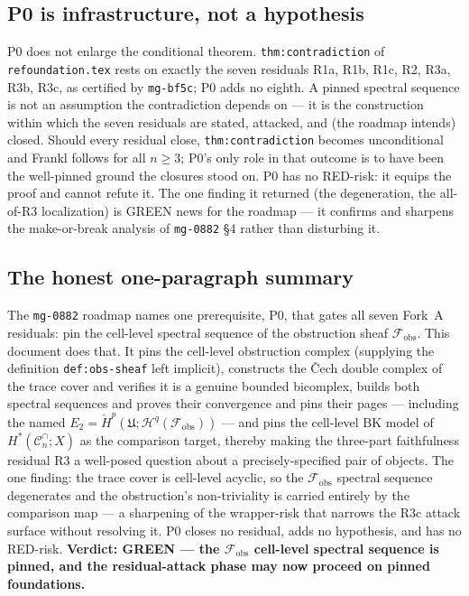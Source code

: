 \documentclass[11pt,oneside]{amsart}
\theoremstyle{plain}
\theoremstyle{definition}
\theoremstyle{remark}
\theoremstyle{honeststyle}
\newcommand{\Cn}{\mathcal{C}^{\cap}_n}
\newcommand{\BK}{\mathrm{BK}}
\newcommand{\fobs}{\mathcal{F}_{\mathrm{obs}}}
\newcommand{\Uf}{\mathfrak{U}}
\begin{document}
\subsection{P0 is infrastructure, not a hypothesis}
\label{ssec:not-hypothesis}

P0 does not enlarge the conditional theorem. \texttt{thm:contradiction}
of \texttt{refoundation.tex} rests on exactly the seven residuals R1a,
R1b, R1c, R2, R3a, R3b, R3c, as certified by \texttt{mg-bf5c}; P0 adds
no eighth. A pinned spectral sequence is not an assumption the
contradiction depends on --- it is the construction within which the
seven residuals are stated, attacked, and (the roadmap intends)
closed. Should every residual close, \texttt{thm:contradiction}
becomes unconditional and Frankl follows for all $n\ge3$; P0's only
role in that outcome is to have been the well-pinned ground the
closures stood on. P0 has no RED-risk: it equips the proof and cannot
refute it. The one finding it returned (the degeneration, the
all-of-R3 localization) is GREEN news for the roadmap --- it confirms
and sharpens the make-or-break analysis of \texttt{mg-0882} \S4
rather than disturbing it.

\subsection{The honest one-paragraph summary}
\label{ssec:summary}

The \texttt{mg-0882} roadmap names one prerequisite, P0, that gates
all seven Fork~A residuals: pin the cell-level spectral sequence of
the obstruction sheaf $\fobs$. This document does that. It pins the
cell-level obstruction complex (supplying the definition
\texttt{def:obs-sheaf} left implicit), constructs the \v{C}ech double
complex of the trace cover and verifies it is a genuine bounded
bicomplex, builds both spectral sequences and proves their convergence
and pins their pages --- including the named $E_{2}=\check
H^{p}(\Uf;\mathcal H^{q}(\fobs))$ --- and pins the cell-level $\BK$
model of $H^{*}(\Cn;X)$ as the comparison target, thereby making the
three-part faithfulness residual R3 a well-posed question about a
precisely-specified pair of objects. The one finding: the trace cover
is cell-level acyclic, so the $\fobs$ spectral sequence degenerates
and the obstruction's non-triviality is carried entirely by the
comparison map --- a sharpening of the wrapper-risk that narrows the
R3c attack surface without resolving it. P0 closes no residual,
adds no hypothesis, and has no RED-risk. \textbf{Verdict: GREEN ---
the $\fobs$ cell-level spectral sequence is pinned, and the
residual-attack phase may now proceed on pinned foundations.}
\end{document}
